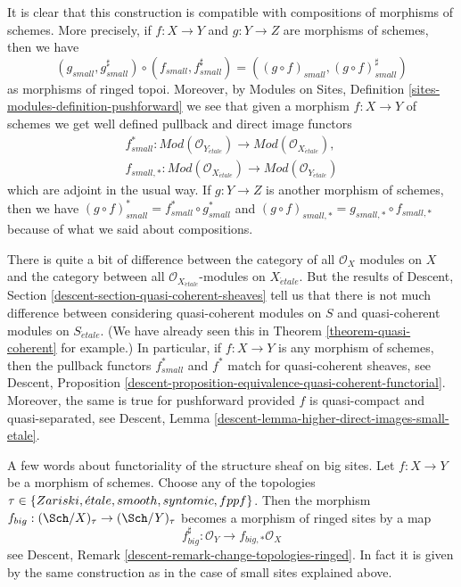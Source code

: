 \medskip\noindent
It is clear that this construction is compatible with compositions of
morphisms of schemes. More precisely, if $f : X \to Y$ and $g : Y \to Z$
are morphisms of schemes, then we have
$$
(g_{small}, g_{small}^\sharp)
\circ
(f_{small}, f_{small}^\sharp)
=
((g \circ f)_{small}, (g \circ f)_{small}^\sharp)
$$
as morphisms of ringed topoi. Moreover, by
Modules on Sites, Definition \ref{sites-modules-definition-pushforward}
we see that given a morphism $f : X \to Y$ of schemes
we get well defined pullback and direct image functors
\begin{align*}
f_{small}^* :
\textit{Mod}(\mathcal{O}_{Y_{\acute{e}tale}})
\longrightarrow
\textit{Mod}(\mathcal{O}_{X_{\acute{e}tale}}), \\
f_{small, *} :
\textit{Mod}(\mathcal{O}_{X_{\acute{e}tale}})
\longrightarrow
\textit{Mod}(\mathcal{O}_{Y_{\acute{e}tale}})
\end{align*}
which are adjoint in the usual way. If $g : Y \to Z$ is another morphism
of schemes, then we have
$(g \circ f)_{small}^* = f_{small}^* \circ g_{small}^*$
and $(g \circ f)_{small, *} = g_{small, *} \circ f_{small, *}$
because of what we said about compositions.

\medskip\noindent
There is quite a bit of difference between the category
of all $\mathcal{O}_X$ modules on $X$ and the category between all
$\mathcal{O}_{X_{\acute{e}tale}}$-modules on $X_{\acute{e}tale}$. But the
results of
Descent, Section \ref{descent-section-quasi-coherent-sheaves}
tell us that there is not much difference between considering quasi-coherent
modules on $S$ and quasi-coherent modules on $S_{\acute{e}tale}$.
(We have already seen this in
Theorem \ref{theorem-quasi-coherent}
for example.)
In particular, if $f : X \to Y$ is any morphism of schemes, then
the pullback functors $f_{small}^*$ and $f^*$ match for
quasi-coherent sheaves, see
Descent,
Proposition \ref{descent-proposition-equivalence-quasi-coherent-functorial}.
Moreover, the same is true for pushforward provided $f$ is
quasi-compact and quasi-separated, see
Descent, Lemma \ref{descent-lemma-higher-direct-images-small-etale}.

\medskip\noindent
A few words about functoriality of the structure sheaf on big sites.
Let $f : X \to Y$ be a morphism of schemes. Choose any of the
topologies $\tau \in \{Zariski,\linebreak[0]
\acute{e}tale,\linebreak[0] smooth,\linebreak[0] syntomic,\linebreak[0]
fppf\}$. Then the morphism
$f_{big} : (\Sch/X)_\tau \to (\Sch/Y)_\tau$
becomes a morphism of ringed sites by a map
$$
f_{big}^\sharp : \mathcal{O}_Y \longrightarrow f_{big, *}\mathcal{O}_X
$$
see Descent, Remark \ref{descent-remark-change-topologies-ringed}.
In fact it is given by the same construction as in the case of small
sites explained above.








